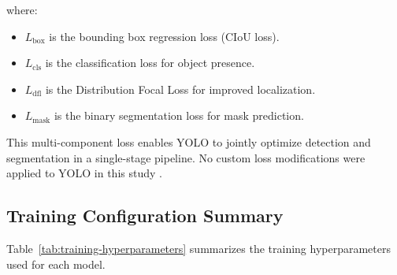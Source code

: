 where:

\begin{itemize}
    \item $L_{\text{box}}$ is the bounding box regression loss (CIoU loss).
    \item $L_{\text{cls}}$ is the classification loss for object presence.
    \item $L_{\text{dfl}}$ is the Distribution Focal Loss for improved localization.
    \item $L_{\text{mask}}$ is the binary segmentation loss for mask prediction.
\end{itemize}

\hs This multi-component loss enables YOLO to jointly optimize detection and segmentation in a single-stage pipeline. No custom loss modifications were applied to YOLO in this study \cite{31-sapkota-2026-yolo26}.

\subsection{Training Configuration Summary}
\label{subsec"training_config_summary}

Table~\ref{tab:training-hyperparameters} summarizes the training hyperparameters used for each model.

